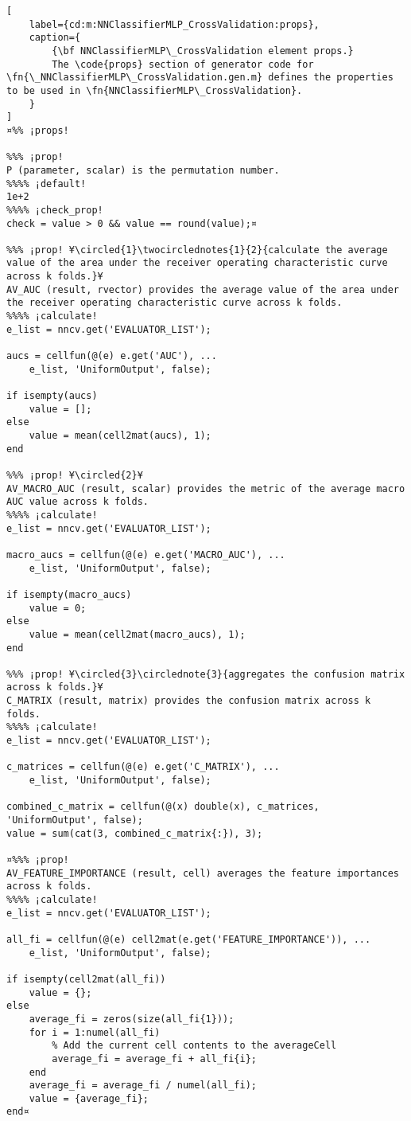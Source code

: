 \documentclass{tufte-handout}
\begin{document}
\begin{lstlisting}[
	label={cd:m:NNClassifierMLP_CrossValidation:props},
	caption={
		{\bf NNClassifierMLP\_CrossValidation element props.}
		The \code{props} section of generator code for \fn{\_NNClassifierMLP\_CrossValidation.gen.m} defines the properties to be used in \fn{NNClassifierMLP\_CrossValidation}.
	}
]
¤%% ¡props!

%%% ¡prop!
P (parameter, scalar) is the permutation number.
%%%% ¡default!
1e+2
%%%% ¡check_prop!
check = value > 0 && value == round(value);¤

%%% ¡prop! ¥\circled{1}\twocirclednotes{1}{2}{calculate the average value of the area under the receiver operating characteristic curve across k folds.}¥
AV_AUC (result, rvector) provides the average value of the area under the receiver operating characteristic curve across k folds.
%%%% ¡calculate!
e_list = nncv.get('EVALUATOR_LIST');

aucs = cellfun(@(e) e.get('AUC'), ...
    e_list, 'UniformOutput', false);

if isempty(aucs)
    value = [];
else
    value = mean(cell2mat(aucs), 1);
end

%%% ¡prop! ¥\circled{2}¥
AV_MACRO_AUC (result, scalar) provides the metric of the average macro AUC value across k folds.
%%%% ¡calculate!
e_list = nncv.get('EVALUATOR_LIST');

macro_aucs = cellfun(@(e) e.get('MACRO_AUC'), ...
    e_list, 'UniformOutput', false);

if isempty(macro_aucs)
    value = 0;
else
    value = mean(cell2mat(macro_aucs), 1);
end

%%% ¡prop! ¥\circled{3}\circlednote{3}{aggregates the confusion matrix across k folds.}¥
C_MATRIX (result, matrix) provides the confusion matrix across k folds.
%%%% ¡calculate!
e_list = nncv.get('EVALUATOR_LIST');

c_matrices = cellfun(@(e) e.get('C_MATRIX'), ...
    e_list, 'UniformOutput', false);

combined_c_matrix = cellfun(@(x) double(x), c_matrices, 'UniformOutput', false);
value = sum(cat(3, combined_c_matrix{:}), 3);

¤%%% ¡prop!
AV_FEATURE_IMPORTANCE (result, cell) averages the feature importances across k folds.
%%%% ¡calculate!
e_list = nncv.get('EVALUATOR_LIST');

all_fi = cellfun(@(e) cell2mat(e.get('FEATURE_IMPORTANCE')), ...
    e_list, 'UniformOutput', false);

if isempty(cell2mat(all_fi))
    value = {};
else
    average_fi = zeros(size(all_fi{1}));
    for i = 1:numel(all_fi)
        % Add the current cell contents to the averageCell
        average_fi = average_fi + all_fi{i};
    end
    average_fi = average_fi / numel(all_fi);
    value = {average_fi};
end¤
\end{lstlisting}
\end{document}

